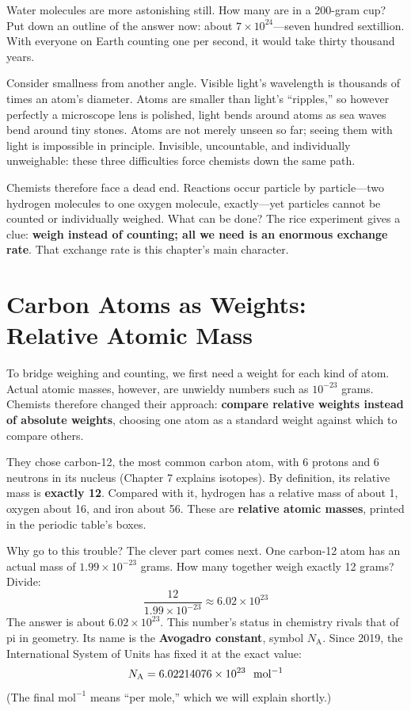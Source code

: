 Water molecules are more astonishing still. How many are in a 200-gram cup? Put down an outline of the answer now: about $7\times 10^{24}$---seven hundred sextillion. With everyone on Earth counting one per second, it would take thirty thousand years.

Consider smallness from another angle. Visible light's wavelength is thousands of times an atom's diameter. Atoms are smaller than light's ``ripples,'' so however perfectly a microscope lens is polished, light bends around atoms as sea waves bend around tiny stones. Atoms are not merely unseen so far; seeing them with light is impossible in principle. Invisible, uncountable, and individually unweighable: these three difficulties force chemists down the same path.

Chemists therefore face a dead end. Reactions occur particle by particle---two hydrogen molecules to one oxygen molecule, exactly---yet particles cannot be counted or individually weighed. What can be done? The rice experiment gives a clue: \textbf{weigh instead of counting; all we need is an enormous exchange rate}. That exchange rate is this chapter's main character.

\section{Carbon Atoms as Weights: Relative Atomic Mass}

To bridge weighing and counting, we first need a weight for each kind of atom. Actual atomic masses, however, are unwieldy numbers such as $10^{-23}$ grams. Chemists therefore changed their approach: \textbf{compare relative weights instead of absolute weights}, choosing one atom as a standard weight against which to compare others.

They chose carbon-12, the most common carbon atom, with 6 protons and 6 neutrons in its nucleus (Chapter 7 explains isotopes). By definition, its relative mass is \textbf{exactly 12}. Compared with it, hydrogen has a relative mass of about 1, oxygen about 16, and iron about 56. These are \textbf{relative atomic masses}, printed in the periodic table's boxes.

Why go to this trouble? The clever part comes next. One carbon-12 atom has an actual mass of $1.99\times 10^{-23}$ grams. How many together weigh exactly 12 grams? Divide:
\[
\frac{12}{1.99\times 10^{-23}}\approx 6.02\times 10^{23}
\]
The answer is about $6.02\times 10^{23}$. This number's status in chemistry rivals that of pi in geometry. Its name is the \textbf{Avogadro constant}, symbol $N_{\mathrm{A}}$. Since 2019, the International System of Units has fixed it at the exact value:
\[
N_{\mathrm{A}}=6.02214076\times 10^{23}\ \ \mathrm{mol^{-1}}
\]
(The final $\mathrm{mol^{-1}}$ means ``per mole,'' which we will explain shortly.)

